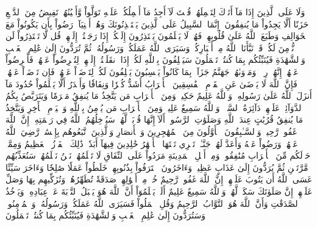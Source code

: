 وَلَا عَلَى ٱلَّذِينَ إِذَا مَآ أَتَوۡكَ لِتَحۡمِلَهُمۡ قُلۡتَ لَآ أَجِدُ مَآ أَحۡمِلُكُمۡ عَلَيۡهِ تَوَلَّواْ وَّأَعۡيُنُهُمۡ تَفِيضُ مِنَ ٱلدَّمۡعِ حَزَنًا أَلَّا يَجِدُواْ مَا يُنفِقُونَ
۞إِنَّمَا ٱلسَّبِيلُ عَلَى ٱلَّذِينَ يَسۡتَـٔۡذِنُونَكَ وَهُمۡ أَغۡنِيَآءُۚ رَضُواْ بِأَن يَكُونُواْ مَعَ ٱلۡخَوَالِفِ وَطَبَعَ ٱللَّهُ عَلَىٰ قُلُوبِهِمۡ فَهُمۡ لَا يَعۡلَمُونَ
يَعۡتَذِرُونَ إِلَيۡكُمۡ إِذَا رَجَعۡتُمۡ إِلَيۡهِمۡۚ قُل لَّا تَعۡتَذِرُواْ لَن نُّؤۡمِنَ لَكُمۡ قَدۡ نَبَّأَنَا ٱللَّهُ مِنۡ أَخۡبَارِكُمۡۚ وَسَيَرَى ٱللَّهُ عَمَلَكُمۡ وَرَسُولُهُۥ ثُمَّ تُرَدُّونَ إِلَىٰ عَٰلِمِ ٱلۡغَيۡبِ وَٱلشَّهَٰدَةِ فَيُنَبِّئُكُم بِمَا كُنتُمۡ تَعۡمَلُونَ
سَيَحۡلِفُونَ بِٱللَّهِ لَكُمۡ إِذَا ٱنقَلَبۡتُمۡ إِلَيۡهِمۡ لِتُعۡرِضُواْ عَنۡهُمۡۖ فَأَعۡرِضُواْ عَنۡهُمۡۖ إِنَّهُمۡ رِجۡسٞۖ وَمَأۡوَىٰهُمۡ جَهَنَّمُ جَزَآءَۢ بِمَا كَانُواْ يَكۡسِبُونَ
يَحۡلِفُونَ لَكُمۡ لِتَرۡضَوۡاْ عَنۡهُمۡۖ فَإِن تَرۡضَوۡاْ عَنۡهُمۡ فَإِنَّ ٱللَّهَ لَا يَرۡضَىٰ عَنِ ٱلۡقَوۡمِ ٱلۡفَٰسِقِينَ
ٱلۡأَعۡرَابُ أَشَدُّ كُفۡرٗا وَنِفَاقٗا وَأَجۡدَرُ أَلَّا يَعۡلَمُواْ حُدُودَ مَآ أَنزَلَ ٱللَّهُ عَلَىٰ رَسُولِهِۦۗ وَٱللَّهُ عَلِيمٌ حَكِيمٞ
وَمِنَ ٱلۡأَعۡرَابِ مَن يَتَّخِذُ مَا يُنفِقُ مَغۡرَمٗا وَيَتَرَبَّصُ بِكُمُ ٱلدَّوَآئِرَۚ عَلَيۡهِمۡ دَآئِرَةُ ٱلسَّوۡءِۗ وَٱللَّهُ سَمِيعٌ عَلِيمٞ
وَمِنَ ٱلۡأَعۡرَابِ مَن يُؤۡمِنُ بِٱللَّهِ وَٱلۡيَوۡمِ ٱلۡأٓخِرِ وَيَتَّخِذُ مَا يُنفِقُ قُرُبَٰتٍ عِندَ ٱللَّهِ وَصَلَوَٰتِ ٱلرَّسُولِۚ أَلَآ إِنَّهَا قُرۡبَةٞ لَّهُمۡۚ سَيُدۡخِلُهُمُ ٱللَّهُ فِي رَحۡمَتِهِۦٓۚ إِنَّ ٱللَّهَ غَفُورٞ رَّحِيمٞ
وَٱلسَّـٰبِقُونَ ٱلۡأَوَّلُونَ مِنَ ٱلۡمُهَٰجِرِينَ وَٱلۡأَنصَارِ وَٱلَّذِينَ ٱتَّبَعُوهُم بِإِحۡسَٰنٖ رَّضِيَ ٱللَّهُ عَنۡهُمۡ وَرَضُواْ عَنۡهُ وَأَعَدَّ لَهُمۡ جَنَّـٰتٖ تَجۡرِي تَحۡتَهَا ٱلۡأَنۡهَٰرُ خَٰلِدِينَ فِيهَآ أَبَدٗاۚ ذَٰلِكَ ٱلۡفَوۡزُ ٱلۡعَظِيمُ
وَمِمَّنۡ حَوۡلَكُم مِّنَ ٱلۡأَعۡرَابِ مُنَٰفِقُونَۖ وَمِنۡ أَهۡلِ ٱلۡمَدِينَةِ مَرَدُواْ عَلَى ٱلنِّفَاقِ لَا تَعۡلَمُهُمۡۖ نَحۡنُ نَعۡلَمُهُمۡۚ سَنُعَذِّبُهُم مَّرَّتَيۡنِ ثُمَّ يُرَدُّونَ إِلَىٰ عَذَابٍ عَظِيمٖ
وَءَاخَرُونَ ٱعۡتَرَفُواْ بِذُنُوبِهِمۡ خَلَطُواْ عَمَلٗا صَٰلِحٗا وَءَاخَرَ سَيِّئًا عَسَى ٱللَّهُ أَن يَتُوبَ عَلَيۡهِمۡۚ إِنَّ ٱللَّهَ غَفُورٞ رَّحِيمٌ
خُذۡ مِنۡ أَمۡوَٰلِهِمۡ صَدَقَةٗ تُطَهِّرُهُمۡ وَتُزَكِّيهِم بِهَا وَصَلِّ عَلَيۡهِمۡۖ إِنَّ صَلَوٰتَكَ سَكَنٞ لَّهُمۡۗ وَٱللَّهُ سَمِيعٌ عَلِيمٌ
أَلَمۡ يَعۡلَمُوٓاْ أَنَّ ٱللَّهَ هُوَ يَقۡبَلُ ٱلتَّوۡبَةَ عَنۡ عِبَادِهِۦ وَيَأۡخُذُ ٱلصَّدَقَٰتِ وَأَنَّ ٱللَّهَ هُوَ ٱلتَّوَّابُ ٱلرَّحِيمُ
وَقُلِ ٱعۡمَلُواْ فَسَيَرَى ٱللَّهُ عَمَلَكُمۡ وَرَسُولُهُۥ وَٱلۡمُؤۡمِنُونَۖ وَسَتُرَدُّونَ إِلَىٰ عَٰلِمِ ٱلۡغَيۡبِ وَٱلشَّهَٰدَةِ فَيُنَبِّئُكُم بِمَا كُنتُمۡ تَعۡمَلُونَ
